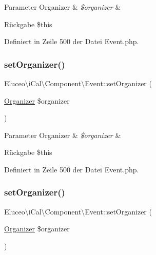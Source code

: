 \begin{DoxyParams}[1]{Parameter}
Organizer & {\em \$organizer} & \\
\hline
\end{DoxyParams}
\begin{DoxyReturn}{Rückgabe}
\$this 
\end{DoxyReturn}


Definiert in Zeile 500 der Datei Event.\+php.

\mbox{\label{class_eluceo_1_1i_cal_1_1_component_1_1_event_a62d9b8061a582bb16162bea9d5ddbb40}} 
\subsubsection{\texorpdfstring{set\+Organizer()}{setOrganizer()}\hspace{0.1cm}{\footnotesize\ttfamily [2/3]}}
{\footnotesize\ttfamily Eluceo\textbackslash{}i\+Cal\textbackslash{}\+Component\textbackslash{}\+Event\+::set\+Organizer (\begin{DoxyParamCaption}\item[{\mbox{\hyperlink{class_eluceo_1_1i_cal_1_1_property_1_1_event_1_1_organizer}{Organizer}}}]{\$organizer }\end{DoxyParamCaption})}


\begin{DoxyParams}[1]{Parameter}
Organizer & {\em \$organizer} & \\
\hline
\end{DoxyParams}
\begin{DoxyReturn}{Rückgabe}
\$this 
\end{DoxyReturn}


Definiert in Zeile 500 der Datei Event.\+php.

\mbox{\label{class_eluceo_1_1i_cal_1_1_component_1_1_event_a62d9b8061a582bb16162bea9d5ddbb40}} 
\subsubsection{\texorpdfstring{set\+Organizer()}{setOrganizer()}\hspace{0.1cm}{\footnotesize\ttfamily [3/3]}}
{\footnotesize\ttfamily Eluceo\textbackslash{}i\+Cal\textbackslash{}\+Component\textbackslash{}\+Event\+::set\+Organizer (\begin{DoxyParamCaption}\item[{\mbox{\hyperlink{class_eluceo_1_1i_cal_1_1_property_1_1_event_1_1_organizer}{Organizer}}}]{\$organizer }\end{DoxyParamCaption})}


